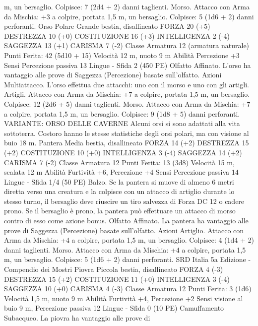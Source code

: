 \begin{multicols}{2}
m, un bersaglio.
Colpisce: 7 (2d4 + 2) danni taglienti.
Morso. Attacco con Arma da Mischia: +3 a colpire, portata 1,5
m, un bersaglio.
Colpisce: 5 (1d6 + 2) danni perforanti.
Orso Polare
Grande bestia, disallineato
FORZA 20 (+5)
DESTREZZA 10 (+0)
COSTITUZIONE 16 (+3)
INTELLIGENZA 2 (-4)
SAGGEZZA 13 (+1)
CARISMA 7 (-2)
Classe Armatura 12 (armatura naturale)
\hspace*{0pt}\hfill{Punti Ferita}: 42 (5d10 + 15)
Velocità 12 m, nuoto 9 m
Abilità Percezione +3
Sensi Percezione passiva 13
Lingue -
Sfida 2 (450 PE)
Olfatto Affinato. L’orso ha vantaggio alle prove di Saggezza
(Percezione) basate sull’olfatto.
Azioni
Multiattacco. L’orso effettua due attacchi: uno con il morso e
uno con gli artigli.
Artigli. Attacco con Arma da Mischia: +7 a colpire, portata 1,5
m, un bersaglio.
Colpisce: 12 (2d6 + 5) danni taglienti.
Morso. Attacco con Arma da Mischia: +7 a colpire, portata 1,5
m, un bersaglio.
Colpisce: 9 (1d8 + 5) danni perforanti.
VARIANTE: ORSO DELLE CAVERNE
Alcuni orsi si sono adattati alla vita sottoterra. Costoro hanno le
stesse statistiche degli orsi polari, ma con visione al buio 18 m.
Pantera
Media bestia, disallineato
FORZA 14 (+2)
DESTREZZA 15 (+2)
COSTITUZIONE 10 (+0)
INTELLIGENZA 3 (-4)
SAGGEZZA 14 (+2)
CARISMA 7 (-2)
Classe Armatura 12
\hspace*{0pt}\hfill{Punti Ferita}: 13 (3d8)
Velocità 15 m, scalata 12 m
Abilità Furtività +6, Percezione +4
Sensi Percezione passiva 14
Lingue -
Sfida 1/4 (50 PE)
Balzo. Se la pantera si muove di almeno 6 metri diretta verso una
creatura e la colpisce con un attacco di artiglio durante lo stesso
turno, il bersaglio deve riuscire un tiro salvezza di Forza DC 12 o
cadere prono. Se il bersaglio è prono, la pantera può effettuare un
attacco di morso contro di esso come azione bonus.
Olfatto Affinato. La pantera ha vantaggio alle prove di Saggezza
(Percezione) basate sull’olfatto.
Azioni
Artiglio. Attacco con Arma da Mischia: +4 a colpire, portata 1,5
m, un bersaglio.
Colpisce: 4 (1d4 + 2) danni taglienti.
Morso. Attacco con Arma da Mischia: +4 a colpire, portata 1,5
m, un bersaglio.
Colpisce: 5 (1d6 + 2) danni perforanti.
SRD Italia 5a Edizione - Compendio dei Mostri
Piovra
Piccola bestia, disallineato
FORZA 4 (-3)
DESTREZZA 15 (+2)
COSTITUZIONE 11 (+0)
INTELLIGENZA 3 (-4)
SAGGEZZA 10 (+0)
CARISMA 4 (-3)
Classe Armatura 12
\hspace*{0pt}\hfill{Punti Ferita}: 3 (1d6)
Velocità 1,5 m, nuoto 9 m
Abilità Furtività +4, Percezione +2
Sensi visione al buio 9 m, Percezione passiva 12
Lingue -
Sfida 0 (10 PE)
Camuffamento Subacqueo. La piovra ha vantaggio alle prove di

\end{multicols}
